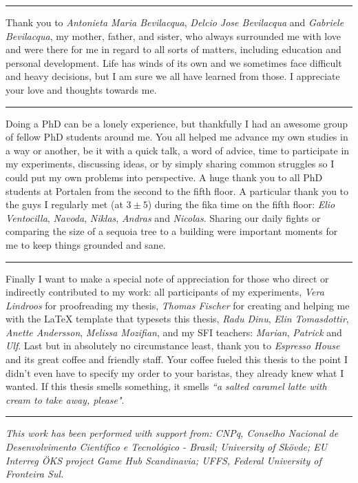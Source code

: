 \vspace{7pt}\hrule\vspace{5pt}

Thank you to \textit{Antonieta Maria Bevilacqua}, \textit{Delcio Jose Bevilacqua} and \textit{Gabriele Bevilacqua}, my mother, father, and sister, who always surrounded me with love and were there for me in regard to all sorts of matters, including education and personal development. Life has winds of its own and we sometimes face difficult and heavy decisions, but I am sure we all have learned from those. I appreciate your love and thoughts towards me.

\vspace{7pt}\hrule\vspace{5pt}

Doing a PhD can be a lonely experience, but thankfully I had an awesome group of fellow PhD students around me. You all helped me advance my own studies in a way or another, be it with a quick talk, a word of advice, time to participate in my experiments, discussing ideas, or by simply sharing common struggles so I could put my own problems into perspective. A huge thank you to all PhD students at Portalen from the second to the fifth floor. A particular thank you to the guys I regularly met (at $3\pm5$) during the fika time on the fifth floor: \textit{Elio Ventocilla}, \textit{Navoda}, \textit{Niklas}, \textit{Andras} and \textit{Nicolas}. Sharing our daily fights or comparing the size of a sequoia tree to a building were important moments for me to keep things grounded and sane.

\vspace{7pt}\hrule\vspace{5pt}

Finally I want to make a special note of appreciation for those who direct or indirectly contributed to my work: all participants of my experiments, \textit{Vera Lindroos} for proofreading my thesis, \textit{Thomas Fischer} for creating and helping me with the {\LaTeX} template that typesets this thesis, \textit{Radu Dinu}, \textit{Elin Tomasdottir}, \textit{Anette Andersson}, \textit{Melissa Mozifian}, and my SFI teachers: \textit{Marian}, \textit{Patrick} and \textit{Ulf}. Last but in absolutely no circumstance least, thank you to \textit{Espresso House} and its great coffee and friendly staff. Your coffee fueled this thesis to the point I didn't even have to specify my order to your baristas, they already knew what I wanted. If this thesis smells something, it smells \textit{``a salted caramel latte with cream to take away, please"}.

\vspace{7pt}\hrule\vspace{5pt}

\textit{This work has been performed with support from: CNPq, Conselho Nacional de Desenvolvimento Cient\'{i}fico e Tecnol\'{o}gico - Brasil; University of Sk\"ovde; EU Interreg \"OKS project Game Hub Scandinavia; UFFS, Federal University of Fronteira Sul.}
